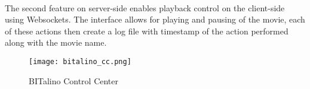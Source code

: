 \paragraph{}
The second feature on server-side enables playback control on the client-side using Websockets. The interface allows for playing and pausing of the movie, each of these actions then create a log file with timestamp of the action performed along with the movie name.
\begin{figure}
	\centering
	\texttt{[image: bitalino\_cc.png]}
	\caption{BITalino Control Center}
	\label{fig:bitalino_cc}
\end{figure}

